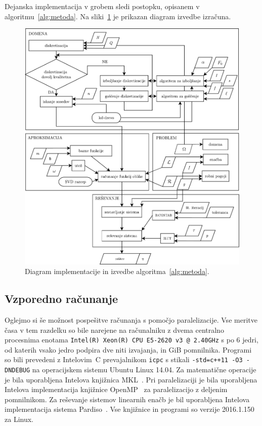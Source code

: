 \documentclass[12pt,a4paper,twoside]{article}
\theoremstyle{definition} %
\theoremstyle{plain} %
\numberwithin{equation}{section}
\newcommand{\CC}{C\nolinebreak\hspace{-.05em}\raisebox{.4ex}{\tiny\bf +}\nolinebreak\hspace{-.10em}\raisebox{.4ex}{\tiny\bf +}}
\begin{document}
Dejanska implementacija v grobem sledi postopku, opisanem v algoritmu~\ref{alg:metoda}. Na
sliki~\ref{fig:implementacija} je prikazan diagram izvedbe izračuna.

\begin{figure}[h!]
  \centering
  \includegraphics[width=\textwidth]{images/diagram_finished.pdf}
  \caption[Diagram implementacije in izvedbe MLSM]{Diagram implementacije in
  izvedbe algoritma~\ref{alg:metoda}.}
  \label{fig:implementacija}
\end{figure}

\subsection{Vzporedno računanje}
Oglejmo si še možnost pospešitve računanja s pomočjo paralelizacije.
Vse meritve časa v tem razdelku so bile narejene na računalniku z dvema centralno procesnima enotama
\texttt{Intel(R) Xeon(R) CPU E5-2620 v3 @ 2.40GHz} s po 6 jedri, od katerih vsako jedro podpira dve
niti izvajanja, in \unit[64]{GiB} pomnilnika.  Programi so bili prevedeni z Intelovim~\CC{}
prevajalnikom \texttt{icpc}  s stikali \texttt{-std=c++11 -O3 -DNDEBUG}
na operacijskem sistemu Ubuntu Linux 14.04. Za matematične operacije je bila uporabljena Intelova
knjižnica MKL~\cite{mkl}. Pri paralelizaciji je bila uporabljena Intelova implementacija knjižnice
OpenMP~\cite{dagum1998openmp} za paralelizacijo z deljenim pomnilnikom. Za reševanje sistemov
linearnih enačb je bil uporabljena Intelova implementacija sistema Pardiso~\cite{pardiso}. Vse
knjižnice in programi so verzije 2016.1.150 za Linux.
\end{document}
